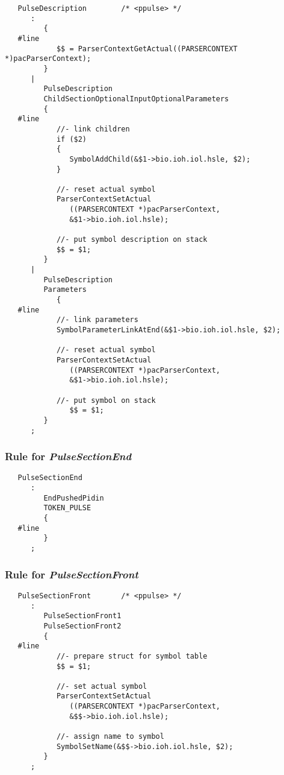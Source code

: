\documentclass[12pt]{article}
\begin{document}
\begin{verbatim}
   PulseDescription        /* <ppulse> */
      :
         {
   #line
            $$ = ParserContextGetActual((PARSERCONTEXT *)pacParserContext);
         }
      |
         PulseDescription
         ChildSectionOptionalInputOptionalParameters
         {
   #line
            //- link children
            if ($2)
            {
               SymbolAddChild(&$1->bio.ioh.iol.hsle, $2);
            }
            
            //- reset actual symbol
            ParserContextSetActual
               ((PARSERCONTEXT *)pacParserContext,
               &$1->bio.ioh.iol.hsle);

            //- put symbol description on stack
            $$ = $1;
         }
      |
         PulseDescription
         Parameters
            {
   #line
            //- link parameters
            SymbolParameterLinkAtEnd(&$1->bio.ioh.iol.hsle, $2);

            //- reset actual symbol
            ParserContextSetActual
               ((PARSERCONTEXT *)pacParserContext,
               &$1->bio.ioh.iol.hsle);

            //- put symbol on stack
               $$ = $1;
         }
      ;
\end{verbatim}

\subsubsection*{Rule for {\it PulseSectionEnd}}

\begin{verbatim}
   PulseSectionEnd
      :
         EndPushedPidin
         TOKEN_PULSE
         {
   #line
         }
      ;
\end{verbatim}

\subsubsection*{Rule for {\it PulseSectionFront}}

\begin{verbatim}
   PulseSectionFront       /* <ppulse> */
      :
         PulseSectionFront1
         PulseSectionFront2
         {
   #line
            //- prepare struct for symbol table
            $$ = $1;

            //- set actual symbol
            ParserContextSetActual
               ((PARSERCONTEXT *)pacParserContext,
               &$$->bio.ioh.iol.hsle);
               
            //- assign name to symbol
            SymbolSetName(&$$->bio.ioh.iol.hsle, $2);
         }
      ;
\end{verbatim}
\end{document}
